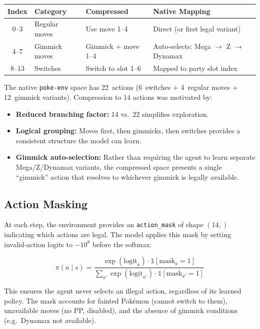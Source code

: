 \begin{center}
\small
\begin{tabularx}{\textwidth}{c l l l}
  \toprule
  \textbf{Index} & \textbf{Category} & \textbf{Compressed} & \textbf{Native Mapping} \\
  \midrule
  0--3  & Regular moves & Use move 1--4    & Direct (or first legal variant) \\
  4--7  & Gimmick moves & Gimmick + move 1--4 & Auto-selects: Mega $\to$ Z $\to$ Dynamax \\
  8--13 & Switches      & Switch to slot 1--6 & Mapped to party slot index \\
  \bottomrule
\end{tabularx}
\end{center}

The native \texttt{poke-env} space has 22~actions (6~switches + 4~regular
moves + 12~gimmick variants).  Compression to 14 actions was motivated by:

\begin{itemize}
  \item \textbf{Reduced branching factor:} 14 vs.\ 22 simplifies exploration.
  \item \textbf{Logical grouping:} Moves first, then gimmicks, then switches
        provides a consistent structure the model can learn.
  \item \textbf{Gimmick auto-selection:} Rather than requiring the agent to
        learn separate Mega/Z/Dynamax variants, the compressed space presents
        a single ``gimmick'' action that resolves to whichever gimmick is
        legally available.
\end{itemize}

\subsection{Action Masking}

At each step, the environment provides an \texttt{action\_mask} of shape
$(14,)$ indicating which actions are legal.  The model applies this mask by
setting invalid-action logits to $-10^{8}$ before the softmax:

\[
  \pi(a \mid s) = \frac{\exp(\text{logit}_a) \cdot \mathbb{1}[\text{mask}_a = 1]}
                       {\sum_{a'} \exp(\text{logit}_{a'}) \cdot \mathbb{1}[\text{mask}_{a'} = 1]}
\]

This ensures the agent never selects an illegal action, regardless of its
learned policy.  The mask accounts for fainted Pok\'{e}mon (cannot switch to
them), unavailable moves (no PP, disabled), and the absence of gimmick
conditions (e.g.\ Dynamax not available).

